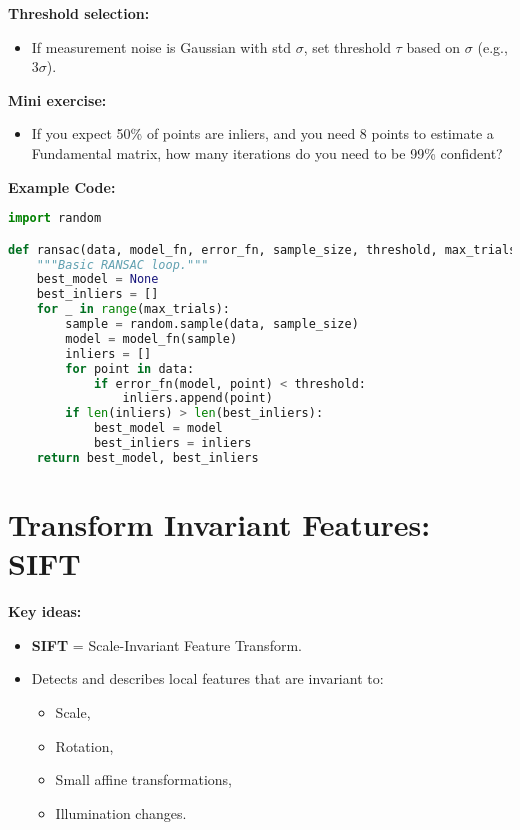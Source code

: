 \documentclass[a4paper,11pt]{article}
\begin{document}
\textbf{Threshold selection:}
\begin{itemize}
    \item If measurement noise is Gaussian with std $\sigma$, set threshold $\tau$ based on $\sigma$ (e.g., $3\sigma$).
\end{itemize}

\textbf{Mini exercise:}
\begin{itemize}
    \item If you expect 50\% of points are inliers, and you need 8 points to estimate a Fundamental matrix, how many iterations do you need to be 99\% confident?
\end{itemize}

\vspace{1em}

\textbf{Example Code:}
\begin{lstlisting}[language=Python]
import random

def ransac(data, model_fn, error_fn, sample_size, threshold, max_trials=1000):
    """Basic RANSAC loop."""
    best_model = None
    best_inliers = []
    for _ in range(max_trials):
        sample = random.sample(data, sample_size)
        model = model_fn(sample)
        inliers = []
        for point in data:
            if error_fn(model, point) < threshold:
                inliers.append(point)
        if len(inliers) > len(best_inliers):
            best_model = model
            best_inliers = inliers
    return best_model, best_inliers
\end{lstlisting}

\newpage
\section{Transform Invariant Features: SIFT}

\textbf{Key ideas:}
\begin{itemize}
    \item \textbf{SIFT} = Scale-Invariant Feature Transform.
    \item Detects and describes local features that are invariant to:
    \begin{itemize}
        \item Scale,
        \item Rotation,
        \item Small affine transformations,
        \item Illumination changes.
    \end{itemize}
\end{itemize}
\end{document}
